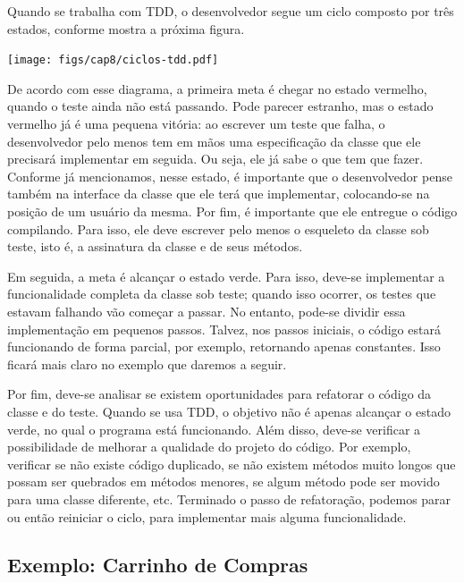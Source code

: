 \documentclass[
  11pt,
  twoside]{book}
\let\origfigure\figure
\let\endorigfigure\endfigure
\renewenvironment{figure}[1][2] {
    \expandafter\origfigure\expandafter[!h]
} {
    \endorigfigure
}
\begin{document}

Quando se trabalha com TDD, o desenvolvedor segue um ciclo composto por
três estados, conforme mostra a próxima figura.

\begin{figure}
\centering
\texttt{[image: figs/cap8/ciclos-tdd.pdf]}
\caption{Ciclos de TDD}
\end{figure}

De acordo com esse diagrama, a primeira meta é chegar no estado
vermelho, quando o teste ainda não está passando. Pode parecer estranho,
mas o estado vermelho já é uma pequena vitória: ao escrever um teste que
falha, o desenvolvedor pelo menos tem em mãos uma especificação da
classe que ele precisará implementar em seguida. Ou seja, ele já sabe o
que tem que fazer. Conforme já mencionamos, nesse estado, é importante
que o desenvolvedor pense também na interface da classe que ele terá que
implementar, colocando-se na posição de um usuário da mesma. Por fim, é
importante que ele entregue o código compilando. Para isso, ele deve
escrever pelo menos o esqueleto da classe sob teste, isto é, a
assinatura da classe e de seus métodos.

Em seguida, a meta é alcançar o estado verde. Para isso, deve-se
implementar a funcionalidade completa da classe sob teste; quando isso
ocorrer, os testes que estavam falhando vão começar a passar. No
entanto, pode-se dividir essa implementação em pequenos passos. Talvez,
nos passos iniciais, o código estará funcionando de forma parcial, por
exemplo, retornando apenas constantes. Isso ficará mais claro no exemplo
que daremos a seguir.

Por fim, deve-se analisar se existem oportunidades para refatorar o
código da classe e do teste. Quando se usa TDD, o objetivo não é apenas
alcançar o estado verde, no qual o programa está funcionando. Além
disso, deve-se verificar a possibilidade de melhorar a qualidade do
projeto do código. Por exemplo, verificar se não existe código
duplicado, se não existem métodos muito longos que possam ser quebrados
em métodos menores, se algum método pode ser movido para uma classe
diferente, etc. Terminado o passo de refatoração, podemos parar ou então
reiniciar o ciclo, para implementar mais alguma funcionalidade.

\hypertarget{exemplo-carrinho-de-compras}{%
\subsection{Exemplo: Carrinho de
Compras}\label{exemplo-carrinho-de-compras}}
\end{document}
